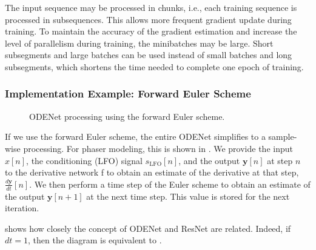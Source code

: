 The input sequence may be processed in chunks, i.e., each training sequence is processed in subsequences. This allows more frequent gradient update during training. To maintain the accuracy of the gradient estimation and increase the level of parallelism during training, the minibatches may be large. Short subsegments and large batches can be used instead of small batches and long subsegments, which shortens the time needed to complete one epoch of training.

\subsubsection{Implementation Example: Forward Euler Scheme}
\label{subsec:odenet_fe}

\begin{figure}
    \centering
    \scalebox{0.7}{}
    \caption{ODENet processing using the forward Euler scheme.}
    \label{fig:odenet_fe_diagram}
\end{figure}

If we use the forward Euler scheme, the entire ODENet simplifies to a sample-wise processing. For phaser modeling, this is shown in . We provide the input $x[n]$, the conditioning (\ac{LFO}) signal $s_\text{LFO}[n]$, and the output $\pmb{y}[n]$ at step $n$ to the derivative network f to obtain an estimate of the derivative at that step, $\frac{d\pmb{y}}{dt}[n]$. We then perform a time step of the Euler scheme to obtain an estimate of the output $\pmb{y}[n+1]$ at the next time step. This value is stored for the next iteration.

 shows how closely the concept of ODENet and \ac{ResNet} are related. Indeed, if $dt = 1$, then the diagram is equivalent to .
